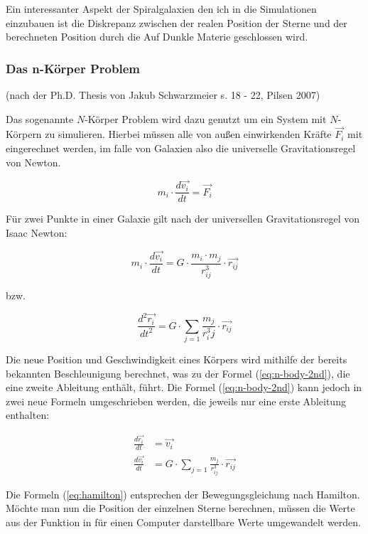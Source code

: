 \par Ein interessanter Aspekt der Spiralgalaxien den ich in die Simulationen
einzubauen ist die Diskrepanz zwischen der realen Position
der Sterne und der berechneten Position durch die Auf Dunkle Materie geschlossen
wird.

\subsubsection{Das n-Körper Problem}

(nach der Ph.D. Thesis von Jakub Schwarzmeier s. 18 - 22, Pilsen 2007)

Das sogenannte \( N \)-Körper Problem wird dazu genutzt um ein System mit
\( N \)-Körpern zu simulieren. Hierbei müssen alle von außen einwirkenden
Kräfte \(\vec{F_{i}} \) mit eingerechnet werden, im falle von Galaxien also die
universelle Gravitationsregel von Newton.

\begin{equation}
  m_{i} \cdot \frac{d\vec{v_{i}}}{dt} = \vec{F_i}
\end{equation}

Für zwei Punkte in einer Galaxie gilt nach der universellen Gravitationsregel von
Isaac Newton:

\begin{equation}
  m_{i} \cdot \frac{d\vec{v_{i}}}{dt} =
  G \cdot \frac{m_{i} \cdot m_{j}}{r^{3}_{ij}} \cdot \vec{r_{ij}}
\end{equation}

bzw.

\begin{equation}\label{eq:n-body-2nd}
  \frac{d^{2}\vec{r_{i}}}{dt^{2}} =
  G \cdot \sum_{j = 1} \frac{m_j}{r^{3}_ij} \cdot \vec{r_{ij}}
\end{equation}

Die neue Position und Geschwindigkeit eines Körpers wird mithilfe der bereits
bekannten Beschleunigung berechnet, was zu der Formel (\ref{eq:n-body-2nd}), die
eine zweite Ableitung enthält, führt. Die Formel (\ref{eq:n-body-2nd}) kann
jedoch in zwei neue Formeln umgeschrieben werden, die jeweils nur eine erste
Ableitung enthalten:

\begin{align}\label{eq:hamilton}
  \frac{d\vec{r_{i}}}{dt} &= \vec{v_i} \\
  \frac{d\vec{v_{i}}}{dt} &= G \cdot \sum_{j = 1} \frac{m_j}{r^{3}_{ij}}
  \cdot \vec{r_{ij}}
\end{align}

Die Formeln (\ref{eq:hamilton}) entsprechen der Bewegungsgleichung nach
Hamilton. Möchte man nun die Position der einzelnen Sterne berechnen, müssen
die Werte aus der Funktion in für einen Computer darstellbare Werte umgewandelt
werden.

